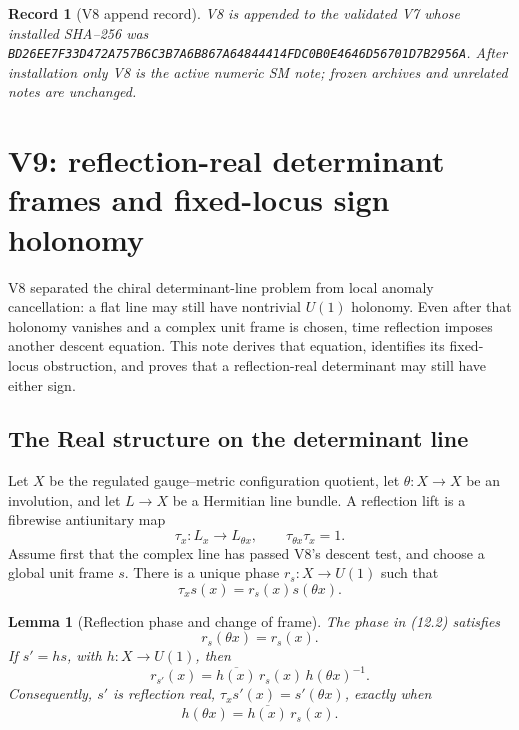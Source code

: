 \documentclass[11pt]{article}
\newtheorem{lemma}[theorem]{Lemma}
\newtheorem{record}[theorem]{Record}
\theoremstyle{remark}
\begin{document}
\begin{record}[V8 append record]
\label{rec:v19v8}
V8 is appended to the validated V7 whose installed SHA--256 was
\texttt{BD26EE7F33D472A757B6C3B7A6B867A64844414FDC0B0E4646D56701D7B2956A}.
After installation only V8 is the active numeric SM note; frozen archives
and unrelated notes are unchanged.
\end{record}



\section{V9: reflection-real determinant frames and fixed-locus sign holonomy}
\label{sec:v19v9}

V8 separated the chiral determinant-line problem from local anomaly
cancellation: a flat line may still have nontrivial \(U(1)\) holonomy.
Even after that holonomy vanishes and a complex unit frame is chosen, time
reflection imposes another descent equation.  This note derives that
equation, identifies its fixed-locus obstruction, and proves that a
reflection-real determinant may still have either sign.

\subsection{The Real structure on the determinant line}

Let \(X\) be the regulated gauge--metric configuration quotient, let
\(\theta:X\to X\) be an involution, and let \(L\to X\) be a Hermitian line
bundle.  A reflection lift is a fibrewise antiunitary map
\[
 \tau_x:L_x\longrightarrow L_{\theta x},\qquad
 \tau_{\theta x}\tau_x=1.                                          \tag{12.1}
\]
Assume first that the complex line has passed V8's descent test, and choose
a global unit frame \(s\).  There is a unique phase
\(r_s:X\to U(1)\) such that
\[
 \tau_xs(x)=r_s(x)s(\theta x).                                 \tag{12.2}
\]

\begin{lemma}[Reflection phase and change of frame]
\label{lem:v19v9-phase}
The phase in (12.2) satisfies
\[
 r_s(\theta x)=r_s(x).                                         \tag{12.3}
\]
If \(s'=hs\), with \(h:X\to U(1)\), then
\[
 r_{s'}(x)=\overline{h(x)}\,r_s(x)\,h(\theta x)^{-1}.           \tag{12.4}
\]
Consequently, \(s'\) is reflection real,
\(\tau_xs'(x)=s'(\theta x)\), exactly when
\[
 h(\theta x)=\overline{h(x)}\,r_s(x).                          \tag{12.5}
\]
\end{lemma}
\end{document}
